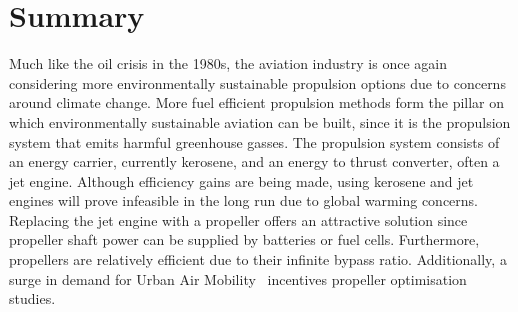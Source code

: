 \chapter*{Summary}
Much like the oil crisis in the 1980s, the aviation industry is once again considering more environmentally sustainable propulsion options due to concerns around climate change. More fuel efficient propulsion methods form the pillar on which environmentally sustainable aviation can be built, since it is the propulsion system that emits harmful greenhouse gasses. The propulsion system consists of an energy carrier, currently kerosene, and an energy to thrust converter, often a jet engine. Although efficiency gains are being made, using kerosene and jet engines will prove infeasible in the long run due to global warming concerns. Replacing the jet engine with a propeller offers an attractive solution since propeller shaft power can be supplied by batteries or fuel cells. Furthermore, propellers are relatively efficient due to their infinite bypass ratio. Additionally, a surge in demand for Urban Air Mobility~\cite{Antcliff2019a} incentives propeller optimisation studies.

